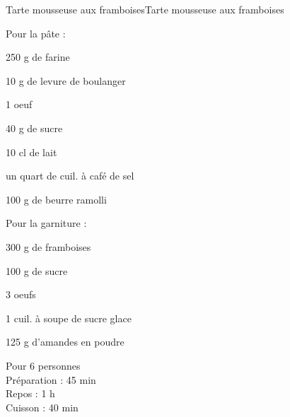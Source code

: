 \begin{recette}{Tarte mousseuse aux framboises}{Tarte mousseuse aux framboises}

\begin{ingredients}
Pour la pâte :\par
	250 g de farine\par
	10 g de levure de boulanger\par
	1 oeuf\par
	40 g de sucre\par
	10 cl de lait\par
	un quart de cuil. à café de sel\par
	100 g de beurre ramolli\par
Pour la garniture :\par
	300 g de framboises \par
	100 g de sucre\par
	3 oeufs\par
	1 cuil. à soupe de sucre glace\par
	125 g d’amandes en poudre\par
\end{ingredients}

\begin{infos}
Pour 6 personnes\\
Préparation : 45 min\\
Repos : 1 h\\
Cuisson : 40 min\\
\end{infos}


\end{recette}
